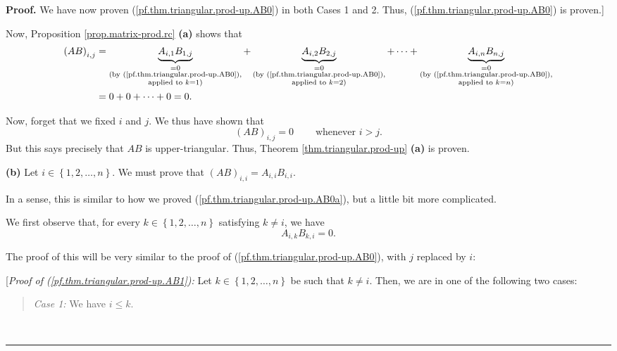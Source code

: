 \documentclass[numbers=enddot,12pt,final,onecolumn,notitlepage]{scrartcl}%
\theoremstyle{definition}
\newenvironment{statement}{\begin{quote}}{\end{quote}}
\newenvironment{proof}[1][Proof]{\noindent\textbf{#1.} }{\ \rule{0.5em}{0.5em}}
\begin{document}
\begin{proof}
We have now proven (\ref{pf.thm.triangular.prod-up.AB0}) in both Cases 1 and
2. Thus, (\ref{pf.thm.triangular.prod-up.AB0}) is proven.]

Now, Proposition \ref{prop.matrix-prod.rc} \textbf{(a)} shows that%
\begin{align*}
\left(  AB\right)  _{i,j}  &  =\underbrace{A_{i,1}B_{1,j}}%
_{\substack{=0\\\text{(by (\ref{pf.thm.triangular.prod-up.AB0}),}%
\\\text{applied to }k=1\text{)}}}+\underbrace{A_{i,2}B_{2,j}}%
_{\substack{=0\\\text{(by (\ref{pf.thm.triangular.prod-up.AB0}),}%
\\\text{applied to }k=2\text{)}}}+\cdots+\underbrace{A_{i,n}B_{n,j}%
}_{\substack{=0\\\text{(by (\ref{pf.thm.triangular.prod-up.AB0}),}%
\\\text{applied to }k=n\text{)}}}\\
&  =0+0+\cdots+0=0.
\end{align*}


Now, forget that we fixed $i$ and $j$. We thus have shown that%
\begin{equation}
\left(  AB\right)  _{i,j}=0\ \ \ \ \ \ \ \ \ \ \text{whenever }i>j.
\label{pf.thm.triangular.prod-up.AB0a}%
\end{equation}
But this says precisely that $AB$ is upper-triangular. Thus, Theorem
\ref{thm.triangular.prod-up} \textbf{(a)} is proven.

\textbf{(b)} Let $i\in\left\{  1,2,\ldots,n\right\}  $. We must prove that
$\left(  AB\right)  _{i,i}=A_{i,i}B_{i,i}$.

In a sense, this is similar to how we proved
(\ref{pf.thm.triangular.prod-up.AB0a}), but a little bit more complicated.

We first observe that, for every $k\in\left\{  1,2,\ldots,n\right\}  $
satisfying $k\neq i$, we have%
\begin{equation}
A_{i,k}B_{k,i}=0. \label{pf.thm.triangular.prod-up.AB1}%
\end{equation}


The proof of this will be very similar to the proof of
(\ref{pf.thm.triangular.prod-up.AB0}), with $j$ replaced by $i$:

[\textit{Proof of (\ref{pf.thm.triangular.prod-up.AB1}):} Let $k\in\left\{
1,2,\ldots,n\right\}  $ be such that $k\neq i$. Then, we are in one of the
following two cases:

\begin{statement}
\textit{Case 1:} We have $i\leq k$.
\end{statement}


\end{proof}
\end{document}
